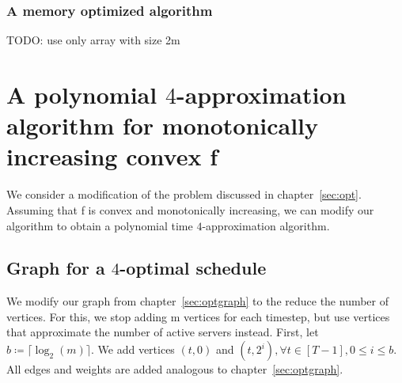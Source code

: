 \documentclass[hidelinks]{article}
\theoremstyle{plain}
\theoremstyle{definition}
\theoremstyle{rem}
\begin{document}
\subsubsection{A memory optimized algorithm}
TODO: use only array with size 2m

\section{A polynomial $4$-approximation algorithm for monotonically increasing convex f}
We consider a modification of the problem discussed in chapter~\ref{sec:opt}. Assuming that f is convex and monotonically increasing, we can modify our algorithm to obtain a polynomial time $4$-approximation algorithm.

\subsection{Graph for a $4$-optimal schedule}
We modify our graph from chapter~\ref{sec:optgraph} to the reduce the number of vertices. For this, we stop adding m vertices for each timestep, but use vertices that approximate the number of active servers instead. First, let $b\coloneqq\lceil\log_2(m)\rceil$. We add vertices $(t,0)$ and $(t,2^i),\forall t\in[T-1],0\le i\le b$. All edges and weights are added analogous to chapter~\ref{sec:optgraph}.
\end{document}
